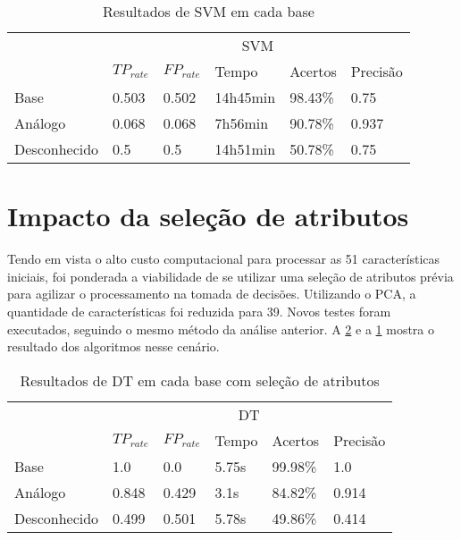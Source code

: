 \begin{table}[h]
    \centering
    \caption{Resultados de SVM em cada base}
    \label{table:svmattrless}
    \begin{tabular}{l|l|l|l|l|l|}
        \cline{2-6}
                                                                   & \multicolumn{5}{c|}{\cellcolor[HTML]{C0C0C0}SVM}          \\ \cline{2-6}
                                                                   & $TP_{rate}$ & $FP_{rate}$ & Tempo    & Acertos & Precisão \\ \hline
        \multicolumn{1}{|l|}{\cellcolor[HTML]{EFEFEF}Base}         & 0.503       & 0.502       & 14h45min & 98.43\%  & 0.75     \\ \hline
        \multicolumn{1}{|l|}{\cellcolor[HTML]{EFEFEF}Análogo}      & 0.068       & 0.068       & 7h56min  & 90.78\%  & 0.937    \\ \hline
        \multicolumn{1}{|l|}{\cellcolor[HTML]{EFEFEF}Desconhecido} & 0.5         & 0.5         & 14h51min & 50.78\%  & 0.75     \\ \hline
    \end{tabular}
\end{table}



\section{Impacto da seleção de atributos}
Tendo em vista o alto custo computacional para processar as 51 características iniciais, foi ponderada a viabilidade
de se utilizar uma seleção de atributos prévia para agilizar o processamento na tomada de decisões. Utilizando o
PCA, a quantidade de características foi reduzida para 39. Novos testes foram executados, seguindo o mesmo método da
análise anterior. A \ref{table:dtattrless} e a \ref{table:svmattrless}  mostra o resultado dos algoritmos nesse cenário.

\begin{table}[h]
    \centering
    \caption{Resultados de DT em cada base com seleção de atributos}
    \label{table:dtattrless}
    \begin{tabular}{l|l|l|l|l|l|}
        \cline{2-6}
                                                                   & \multicolumn{5}{c|}{\cellcolor[HTML]{EFEFEF}DT}        \\ \cline{2-6}
                                                                   & $TP_{rate}$ & $FP_{rate}$ & Tempo & Acertos & Precisão \\ \hline
        \multicolumn{1}{|l|}{\cellcolor[HTML]{EFEFEF}Base}         & 1.0         & 0.0         & 5.75s & 99.98\% & 1.0      \\ \hline
        \multicolumn{1}{|l|}{\cellcolor[HTML]{EFEFEF}Análogo}      & 0.848       & 0.429       & 3.1s  & 84.82\% & 0.914    \\ \hline
        \multicolumn{1}{|l|}{\cellcolor[HTML]{EFEFEF}Desconhecido} & 0.499       & 0.501       & 5.78s & 49.86\% & 0.414    \\ \hline
    \end{tabular}
\end{table}

